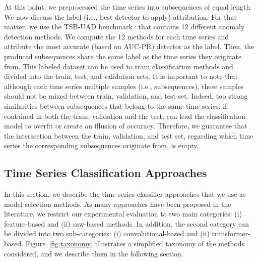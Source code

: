 At this point, we preprocessed the time series into subsequences of equal length. We now discuss the label (i.e.,  best detector to apply) attribution. For that matter, we use the TSB-UAD benchmark~\cite{10.14778/3529337.3529354} that contains 12 different anomaly detection methods. We compute the 12 methods for each time series and attribute the most accurate (based on AUC-PR) detector as the label. Then, the produced subsequences share the same label as the time series they originate from. This labeled dataset can be used to train classification methods and divided into the train, test, and validation sets. It is important to note that although each time series  multiple samples (i.e., subsequences), these samples should not be mixed between train, validation, and test set. Indeed, too strong similarities between subsequences that belong to the same time series, if contained in both the train, validation and the test, can lead the classification model to overfit or create an illusion of accuracy. Therefore, we guarantee that the intersection between the train, validation, and test set, regarding which time series the corresponding subsequences originate from, is empty.

\vspace{-0.1cm}
\subsection{Time Series Classification Approaches}

In this section, we describe the time series classifier approaches that we use as model selection methods. As many approaches have been proposed in the literature, we restrict our experimental evaluation to two main categories: (i) feature-based and (ii) raw-based methods. In addition, the second category can be divided into two sub-categories: (i) convolutional-based and (ii) transformer-based. %
Figure~\ref{fig:taxonomy} illustrates a simplified taxonomy of the methods considered, and we describe them in the following section.

\vspace{-0.1cm}
